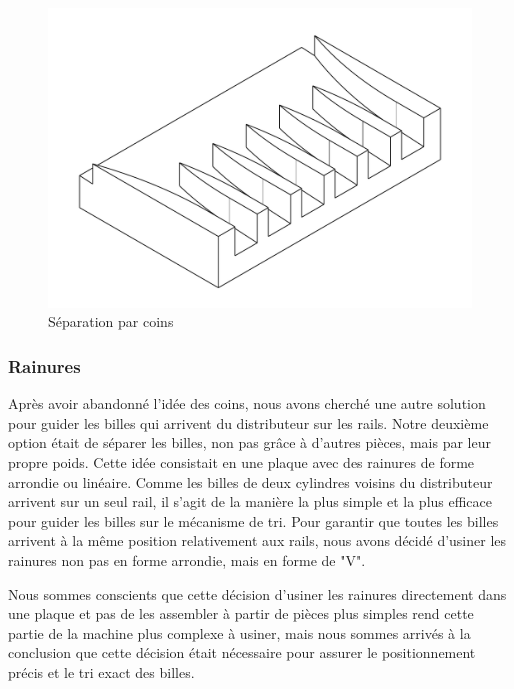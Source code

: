 \begin{figure}
    \centering
    \includegraphics[width=\textwidth]{Graphics/Rails/COINS.pdf}
    \caption{Séparation par coins}
\end{figure}

\subsubsection{Rainures}
Après avoir abandonné l'idée des coins, nous avons cherché une autre solution pour guider les billes qui arrivent du distributeur sur les rails. Notre deuxième option était de séparer les billes, non pas grâce à d'autres pièces, mais par leur propre poids. Cette idée consistait en une plaque avec des rainures de forme arrondie ou linéaire. Comme les billes de deux cylindres voisins du distributeur arrivent sur un seul rail, il s'agit de la manière la plus simple et la plus efficace pour guider les billes sur le mécanisme de tri. Pour garantir que toutes les billes arrivent à la même position relativement aux rails, nous avons décidé d'usiner les rainures non pas en forme arrondie, mais en forme de "V".

Nous sommes conscients que cette décision d'usiner les rainures directement dans une plaque et pas de les assembler à partir de pièces plus simples rend cette partie de la machine plus complexe à usiner, mais nous sommes arrivés à la conclusion que cette décision était nécessaire pour assurer le positionnement précis et le tri exact des billes.


